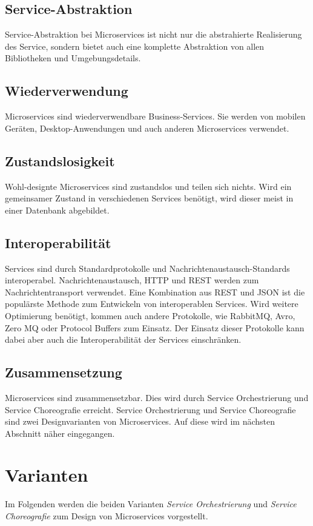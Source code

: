 \subsection{Service-Abstraktion}
Service-Abstraktion bei Microservices ist nicht nur die abstrahierte Realisierung des Service, sondern bietet auch eine komplette Abstraktion von allen Bibliotheken und Umgebungsdetails.

\subsection{Wiederverwendung}
Microservices sind wiederverwendbare Business-Services. Sie werden von mobilen Geräten, Desktop-Anwendungen und auch anderen Microservices verwendet.

\subsection{Zustandslosigkeit}
Wohl-designte Microservices sind zustandslos und teilen sich nichts. Wird ein gemeinsamer Zustand in verschiedenen Services benötigt, wird dieser meist in einer Datenbank abgebildet.

\subsection{Interoperabilität}
Services sind durch Standardprotokolle und Nachrichtenaustausch-Standards interoperabel. Nachrichtenaustausch, HTTP und REST werden zum Nachrichtentransport verwendet. Eine Kombination aus REST und JSON ist die populärste Methode zum Entwickeln von interoperablen Services. Wird weitere Optimierung benötigt, kommen auch andere Protokolle, wie RabbitMQ, Avro, Zero MQ oder Protocol Buffers zum Einsatz. Der Einsatz dieser Protokolle kann dabei aber auch die Interoperabilität der Services einschränken.

\subsection{Zusammensetzung}
Microservices sind zusammensetzbar. Dies wird durch Service Orchestrierung und Service Choreografie erreicht. Service Orchestrierung und Service Choreografie sind zwei Designvarianten von Microservices. Auf diese wird im nächsten Abschnitt näher eingegangen.

\section{Varianten}
Im Folgenden werden die beiden Varianten \textit{Service Orchestrierung} und \textit{Service Choreografie} zum Design von Microservices vorgestellt.

